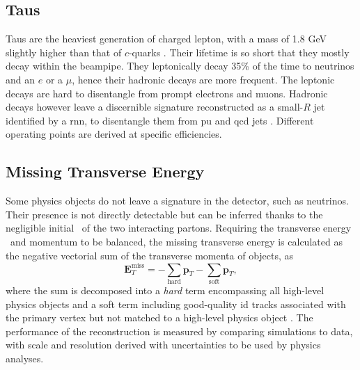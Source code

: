\subsection{Taus}\label{sec-atlas-tau}
Taus are the heaviest generation of charged lepton, with a mass of 1.8 GeV slightly higher than that of $c$-quarks \cite{Tanabashi:2018oca}. Their lifetime is so short that they mostly decay within the beampipe. They leptonically decay 35\% of the time to neutrinos and an $e$ or a $\mu$, hence their hadronic decays are more frequent. The leptonic decays are hard to disentangle from prompt electrons and muons. Hadronic decays however leave a discernible signature reconstructed as a small-$R$ jet identified by a \gls{rnn}, to disentangle them from \gls{pu} and \gls{qcd} jets \cite{ATL-PHYS-PUB-2019-033}. Different operating points are derived at specific efficiencies. 

\newpage
\subsection{Missing Transverse Energy}\label{sec-atlas-met}
Some physics objects do not leave a signature in the detector, such as neutrinos. Their presence is not directly detectable but can be inferred thanks to the negligible initial \pt\ of the two interacting partons. Requiring the transverse energy \etm\ and momentum to be balanced, the missing transverse energy is calculated as the negative vectorial sum of the transverse momenta of objects, as
\begin{equation}
  \boldsymbol{E}_T^{\text{miss}} = - \sum_{\text{hard}} \boldsymbol{p}_T - \sum_{\text{soft}} \boldsymbol{p}_T,
\end{equation}
where the sum is decomposed into a \textit{hard} term encompassing all high-level physics objects and a soft term including good-quality \gls{id} tracks associated with the primary vertex but not matched to a high-level physics object \cite{ATLASmetReco}. The performance of the reconstruction is measured by comparing simulations to data, with scale and resolution derived with uncertainties to be used by physics analyses. 
